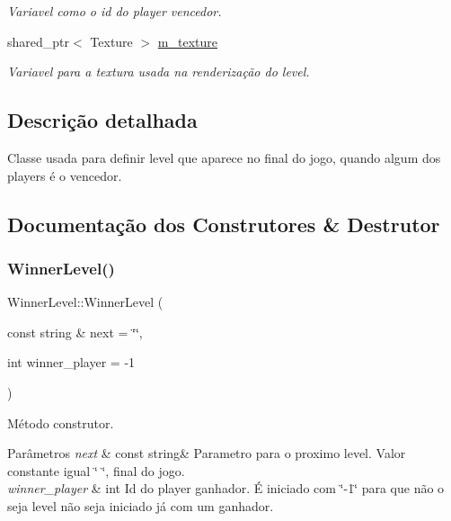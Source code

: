 \begin{DoxyCompactItemize}
\begin{DoxyCompactList}\small\item\em Variavel como o id do player vencedor. \end{DoxyCompactList}\item 
\mbox{\label{classWinnerLevel_a1ca683921327202b36bd4e77a3330101}} 
shared\+\_\+ptr$<$ Texture $>$ \mbox{\hyperlink{classWinnerLevel_a1ca683921327202b36bd4e77a3330101}{m\+\_\+texture}}
\begin{DoxyCompactList}\small\item\em Variavel para a textura usada na renderização do level. \end{DoxyCompactList}\end{DoxyCompactItemize}


\subsection{Descrição detalhada}
Classe usada para definir level que aparece no final do jogo, quando algum dos players é o vencedor. 

\subsection{Documentação dos Construtores \& Destrutor}
\mbox{\label{classWinnerLevel_a63bb2594f3694e69e2735e143448b799}} 
\subsubsection{\texorpdfstring{Winner\+Level()}{WinnerLevel()}}
{\footnotesize\ttfamily Winner\+Level\+::\+Winner\+Level (\begin{DoxyParamCaption}\item[{const string \&}]{next = {\ttfamily \char`\"{}\char`\"{}},  }\item[{int}]{winner\+\_\+player = {\ttfamily -\/1} }\end{DoxyParamCaption})}



Método construtor. 


\begin{DoxyParams}{Parâmetros}
{\em next} & const string\& Parametro para o proximo level. Valor constante igual \char`\"{} \char`\"{}, final do jogo. \\
\hline
{\em winner\+\_\+player} & int Id do player ganhador. É iniciado com \char`\"{}-\/1\char`\"{} para que não o seja level não seja iniciado já com um ganhador. \\
\hline
\end{DoxyParams}


